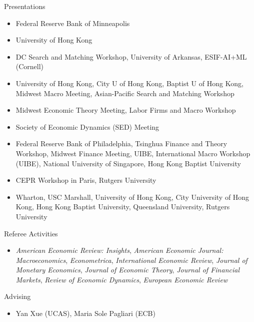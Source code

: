 \documentclass{resume} %
\begin{document}
\begin{rSection}{Presentations}
	\begin{itemize}
		\item[2026 --] Federal Reserve Bank of Minneapolis
		\item[2025 --] University of Hong Kong
		\item[2024 --] DC Search and Matching Workshop, University of Arkansas, ESIF-AI+ML (Cornell)
		\item[2023 --] University of Hong Kong, City U of Hong Kong, Baptist U of Hong Kong, Midwest Macro Meeting, Asian-Pacific Search and Matching Workshop
		\item[2022 --] Midwest Economic Theory Meeting, Labor Firms and Macro Workshop
		\item[2021 --] Society of Economic Dynamics (SED) Meeting
		\item[2019 --] Federal Reserve Bank of Philadelphia, Tsinghua Finance and Theory Workshop, Midwest Finance Meeting, UIBE, International Macro Workshop (UIBE), National University of Singapore, Hong Kong Baptist University
		\item[2018 --] CEPR Workshop in Paris, Rutgers University
		\item[2017 --] Wharton, USC Marshall, University of Hong Kong, City University of Hong Kong, Hong Kong Baptist University, Queensland University, Rutgers University
	\end{itemize}
\end{rSection}

\begin{rSection}{Referee Activities}
	\begin{itemize}
		\item[--] \emph{American Economic Review: Insights}, \emph{American Economic Journal: Macroeconomics}, \emph{Econometrica}, \emph{International Economic Review}, \emph{Journal of Monetary Economics}, \emph{Journal of Economic Theory}, \emph{Journal of Financial Markets}, \emph{Review of Economic Dynamics}, \emph{European Economic Review}
	\end{itemize}
\end{rSection}

\begin{rSection}{Advising}
	\begin{itemize}
		\item[--] Yan Xue (UCAS), Maria Sole Pagliari (ECB)
	\end{itemize}
\end{rSection}
\end{document}

